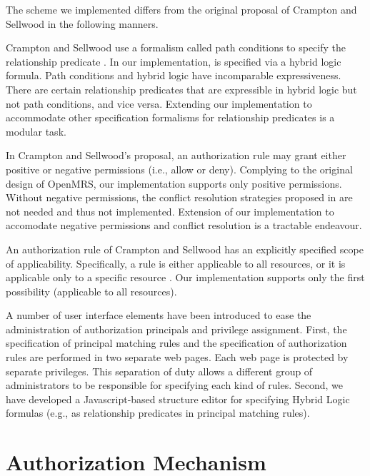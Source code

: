 \documentclass{acm_proc_article-sp}
\begin{document}
The scheme we implemented differs from the original proposal of
Crampton and Sellwood in the following manners.
\begin{compactitem}
\item Crampton and Sellwood use a formalism called path conditions to
  specify the relationship predicate .  In our
  implementation,  is specified via a hybrid logic
  formula.  Path conditions and hybrid logic have incomparable
  expressiveness. There are certain relationship predicates that are
  expressible in hybrid logic but not path conditions, and vice versa.
  Extending our implementation to accommodate other specification
  formalisms for relationship predicates is a modular task.
\item In Crampton and Sellwood's proposal, an authorization rule may
  grant either positive or negative permissions (i.e., allow or deny).
  Complying to the original design of OpenMRS, our implementation
  supports only positive permissions.  Without negative permissions,
  the conflict resolution strategies proposed in
  \cite{Crampton-Sellwood:2014} are not needed and thus not
  implemented.  Extension of our implementation to accomodate negative
  permissions and conflict resolution is a tractable endeavour.
\item An authorization rule of Crampton and Sellwood has an explicitly
  specified scope of applicability.  Specifically, a rule is either
  applicable to all resources, or it is applicable only to a specific
  resource .  Our implementation supports only the first 
  possibility (applicable to all resources).
\end{compactitem}

A number of user interface elements have been introduced to ease the
administration of authorization principals and privilege assignment.
First, the specification of principal matching rules and the
specification of authorization rules are performed in two separate web
pages.  Each web page is protected by separate privileges.  This
separation of duty allows a different group of administrators to be
responsible for specifying each kind of rules.  Second, we have
developed a Javascript-based structure editor for specifying Hybrid
Logic formulas (e.g., as relationship predicates in principal 
matching rules).

\section{Authorization Mechanism}
\label{sec-authorization-mechanism}
\end{document}
